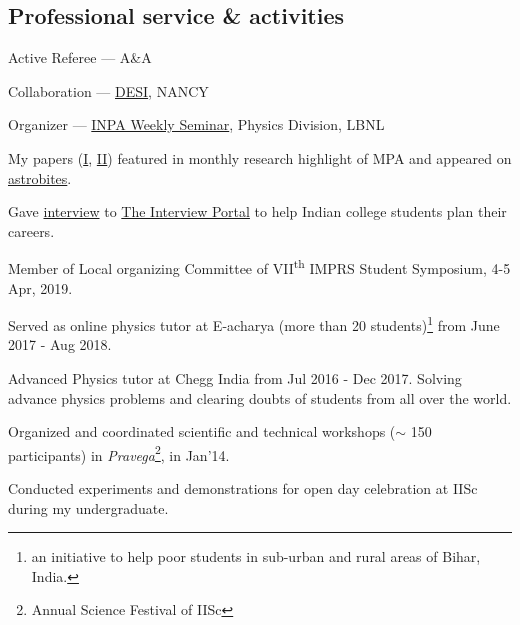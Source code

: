 \documentclass[12pt,letterpaper]{article}
\begin{document}

\subsection{Professional service \& activities}
\begin{list}{}{\cvlist}
  \item Active Referee ---
        A\&A
  \item Collaboration ---
        \href{https://www.desi.lbl.gov/}{DESI}, NANCY
  \item Organizer ---
        \href{https://inpa.lbl.gov/events/}{INPA Weekly Seminar}, Physics Division, LBNL
  \item My papers (\href{https://www.mpa-garching.mpg.de/964620/hl202107}{I}, \href{https://www.mpa-garching.mpg.de/1066558/hl202211?c=27981}{II}) featured in monthly research highlight of MPA and appeared on \href{https://astrobites.org/2021/05/06/cool-metal-gas-search-thanks-it-was-automated/}{astrobites}.
  \item Gave \href{https://theinterviewportal.com/2020/03/13/astrophysicist-interview-8/}{interview} to \href{https://theinterviewportal.com/}{The Interview Portal} to help Indian college students plan their careers. 
  \item Member of Local organizing Committee of VII\textsuperscript{th} IMPRS Student Symposium, 4-5 Apr, 2019.
  \item Served as online physics tutor at E-acharya (more than 20 students)\footnote{an initiative to help poor students in sub-urban and rural areas of Bihar, India.} from June 2017 - Aug 2018.
  \item Advanced Physics tutor at Chegg India from Jul 2016 - Dec 2017. Solving advance physics problems and clearing doubts of students from all over the world.
  \item Organized and coordinated scientific and technical workshops ($\sim$ 150 participants) in \emph{Pravega}\footnote{Annual Science Festival of IISc}, in Jan'14.
  \item Conducted experiments and demonstrations for open day celebration at IISc during my undergraduate.
\end{list}
\end{document}
